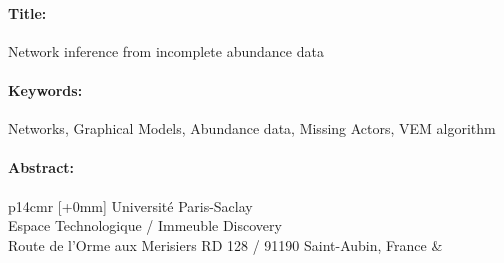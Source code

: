 \begin{mdframed}[linecolor=Prune,linewidth=1]
\vspace{-.25cm}
\paragraph*{Title:} Network inference from incomplete abundance data

\begin{small}
\vspace{-.25cm}
\paragraph*{Keywords:} Networks, Graphical Models, Abundance data, Missing Actors, VEM algorithm

\vspace{-.5cm}
\begin{multicols}{2}
\paragraph*{Abstract:} 
\end{multicols}
\end{small}
\end{mdframed}

\vspace{3cm} %
\selectfont
\begin{tabular}{p{14cm}r}
[+0mm]{{\color{Prune} Université Paris-Saclay\\
Espace Technologique / Immeuble Discovery\\
Route de l’Orme aux Merisiers RD 128 / 91190 Saint-Aubin, France}} & %
\end{tabular}

